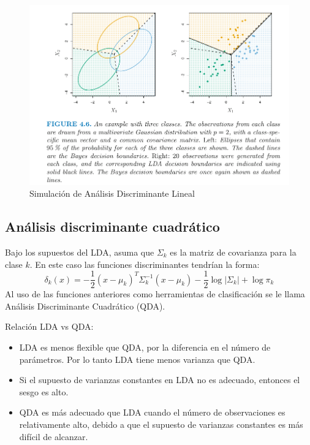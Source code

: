 \documentclass[
  12pt,
]{book}
\providecommand{\tightlist}{%
  \setlength{\itemsep}{0pt}\setlength{\parskip}{0pt}}
\theoremstyle{definition}
\theoremstyle{definition}
\theoremstyle{definition}
\theoremstyle{definition}
\theoremstyle{remark}
\begin{document}
\begin{figure}
\centering
\includegraphics{manual_figures/LDA.png}
\caption{Simulación de Análisis Discriminante Lineal \autocite{James2013b}}
\end{figure}

\hypertarget{anuxe1lisis-discriminante-cuadruxe1tico}{%
\subsection{Análisis discriminante cuadrático}\label{anuxe1lisis-discriminante-cuadruxe1tico}}

Bajo los supuestos del LDA, asuma que \(\Sigma_k\) es la matriz de covarianza para la clase \(k\). En este caso las funciones discriminantes tendrían la forma:
\[\delta_k(x)=-\frac 1 2 (x-\mu_k)^T\Sigma_k^{-1}(x-\mu_k)-\frac 1 2 \log |\Sigma_k|+\log \pi_k\]
Al uso de las funciones anteriores como herramientas de clasificación se le llama Análisis Discriminante Cuadrático (QDA).

Relación LDA vs QDA:

\begin{itemize}
\tightlist
\item
  LDA es menos flexible que QDA, por la diferencia en el número de parámetros. Por lo tanto LDA tiene menos varianza que QDA.
\item
  Si el supuesto de varianzas constantes en LDA no es adecuado, entonces el sesgo es alto.
\item
  QDA es más adecuado que LDA cuando el número de observaciones es relativamente alto, debido a que el supuesto de varianzas constantes es más difícil de alcanzar.
\end{itemize}
\end{document}
